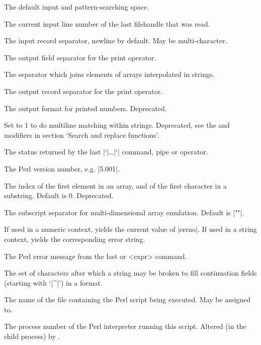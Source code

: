 \documentclass{refbase}
\begin{document}
\begin{enum}{1cm}

The default input and pattern-searching space.

The current input line number of the last filehandle that was read.

The input record separator, newline by default. May be multi-character.

The output field separator for the print operator.

The separator which joins elements of arrays interpolated in strings.

The output record separator for the print operator.

The output format for printed numbers. Deprecated.

Set to 1 to do multiline matching within strings.
Deprecated, see the  and  modifiers in section 
`Search and replace functions'.

The status returned by the last |`|\ldots|`| command, pipe  or
 operator. 

The Perl version number, e.g. |5.001|.

The index of the first element in an array, and of the first character
in a substring. Default is 0. Deprecated.

The subscript separator for multi-dimensional array emulation. Default
is |""|. 

If used in a numeric context, yields the current value of |errno|. If
used in a string context, yields the corresponding error string. 

The Perl error message from the last  or  <expr> command.

The set of characters after which a string may be broken to fill
continuation fields (starting with `|^|') in a format. 

The name of the file containing the Perl script being executed. May be
assigned to. 

The process number of the Perl interpreter running this script. Altered (in the
child process) by . 


\end{enum}
\end{document}
